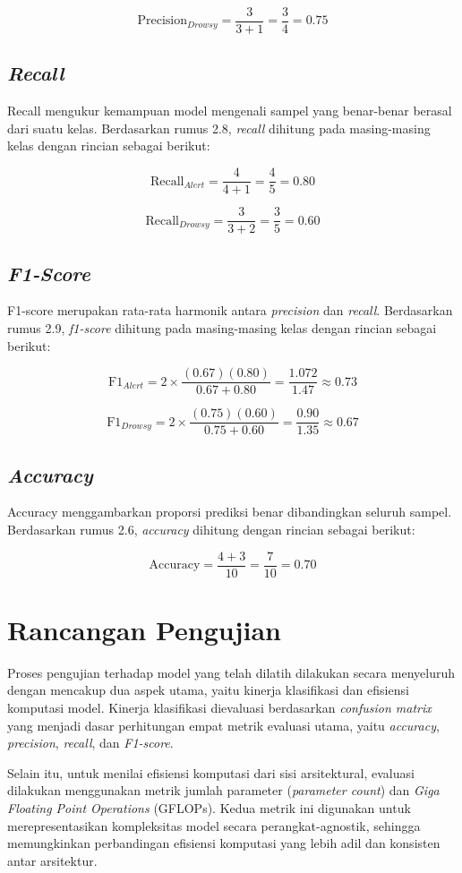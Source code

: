 \[
\text{Precision}_{Drowsy} = \frac{3}{3 + 1} = \frac{3}{4} = 0.75
\]

\subsection{\textit{Recall}}
Recall mengukur kemampuan model mengenali sampel yang benar-benar berasal dari suatu kelas. Berdasarkan rumus 2.8, \textit{recall} dihitung pada masing-masing kelas dengan rincian sebagai berikut:

\[
\text{Recall}_{Alert} = \frac{4}{4 + 1} = \frac{4}{5} = 0.80
\]
\vspace{1em}

\[
\text{Recall}_{Drowsy} = \frac{3}{3 + 2} = \frac{3}{5} = 0.60
\]

\subsection{\textit{F1-Score}}
F1-score merupakan rata-rata harmonik antara \textit{precision} dan \textit{recall}. Berdasarkan rumus 2.9, \textit{f1-score} dihitung pada masing-masing kelas dengan rincian sebagai berikut:

\[
\text{F1}_{Alert} = 2 \times \frac{(0.67)(0.80)}{0.67 + 0.80} = \frac{1.072}{1.47} \approx 0.73
\]
\vspace{1em}

\[
\text{F1}_{Drowsy} = 2 \times \frac{(0.75)(0.60)}{0.75 + 0.60} = \frac{0.90}{1.35} \approx 0.67
\]

\subsection{\textit{Accuracy}}
Accuracy menggambarkan proporsi prediksi benar dibandingkan seluruh sampel. Berdasarkan rumus 2.6, \textit{accuracy} dihitung dengan rincian sebagai berikut:

\[
\text{Accuracy} = \frac{4 + 3}{10} = \frac{7}{10} = 0.70
\]

\section{Rancangan Pengujian}

Proses pengujian terhadap model yang telah dilatih dilakukan secara menyeluruh dengan mencakup dua aspek utama, yaitu kinerja klasifikasi dan efisiensi komputasi model. Kinerja klasifikasi dievaluasi berdasarkan \textit{confusion matrix} yang menjadi dasar perhitungan empat metrik evaluasi utama, yaitu \textit{accuracy}, \textit{precision}, \textit{recall}, dan \textit{F1-score}. 

Selain itu, untuk menilai efisiensi komputasi dari sisi arsitektural, evaluasi dilakukan menggunakan metrik jumlah parameter (\textit{parameter count}) dan \textit{Giga Floating Point Operations} (GFLOPs). Kedua metrik ini digunakan untuk merepresentasikan kompleksitas model secara perangkat-agnostik, sehingga memungkinkan perbandingan efisiensi komputasi yang lebih adil dan konsisten antar arsitektur.
